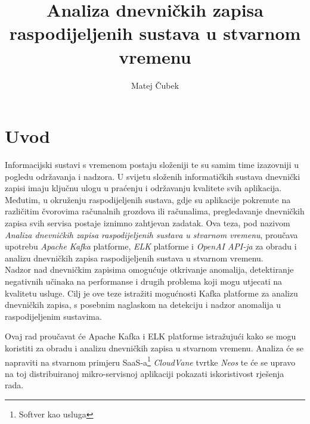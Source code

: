 \documentclass[times, utf8, diplomski]{fer}
\begin{document}

\title{Analiza dnevničkih zapisa raspodijeljenih sustava u stvarnom vremenu}

\author{Matej Čubek}

\maketitle

\zahvala{}

\renewcommand{\lstlistingname}{Isječak koda}%
\renewcommand{\lstlistlistingname}{Indeks isječka kodova}%




\begingroup
\renewcommand*\listfigurename{Indeks slika}
\renewcommand*\listtablename{Indeks tablica}

\listoffigures

\listoftables

\endgroup

\chapter{Uvod}

Informacijski sustavi s vremenom postaju složeniji te su samim time izazovniji u pogledu održavanja i nadzora. U svijetu složenih informatičkih sustava dnevnički zapisi imaju ključnu ulogu u praćenju i održavanju kvalitete svih aplikacija. Međutim, u okruženju raspodijeljenih sustava, gdje su aplikacije pokrenute na različitim čvorovima računalnih grozdova ili računalima, pregledavanje dnevničkih zapisa svih servisa postaje iznimno zahtjevan zadatak. Ova teza, pod nazivom \emph{\glqq Analiza dnevničkih zapisa raspodijeljenih sustava u stvarnom vremenu\grqq}, proučava upotrebu \emph{Apache Kafka} platforme, \emph{ELK} platforme i \emph{OpenAI API-ja} za obradu i analizu dnevničkih zapisa raspodijeljenih sustava u stvarnom vremenu.\\

Nadzor nad dnevničkim zapisima omogućuje otkrivanje anomalija, detektiranje negativnih učinaka na performanse i drugih problema koji mogu utjecati na kvalitetu usluge. Cilj je ove teze istražiti mogućnosti Kafka platforme za analizu dnevničkih zapisa, s posebnim naglaskom na detekciju i nadzor anomalija u raspodijeljenim sustavima.

Ovaj rad proučavat će Apache Kafka  i ELK platforme istražujući kako se mogu koristiti za obradu i analizu dnevničkih zapisa u stvarnom vremenu. Analiza će se napraviti na stvarnom primjeru SaaS-a\footnote{Softver kao usluga } \emph{CloudVane} tvrtke \emph{Neos} te će se upravo na toj distribuiranoj mikro-servisnoj aplikaciji pokazati iskoristivost rješenja rada.
\end{document}
